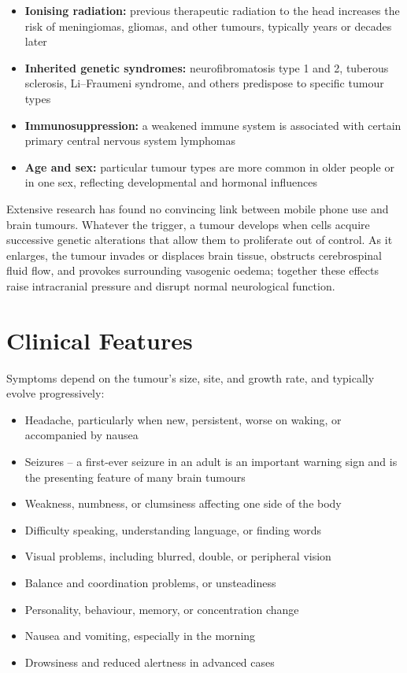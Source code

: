 \begin{itemize}
    \item \textbf{Ionising radiation:} previous therapeutic radiation to the head increases the risk of meningiomas, gliomas, and other tumours, typically years or decades later
    \item \textbf{Inherited genetic syndromes:} neurofibromatosis type 1 and 2, tuberous sclerosis, Li--Fraumeni syndrome, and others predispose to specific tumour types
    \item \textbf{Immunosuppression:} a weakened immune system is associated with certain primary central nervous system lymphomas
    \item \textbf{Age and sex:} particular tumour types are more common in older people or in one sex, reflecting developmental and hormonal influences
\end{itemize}

Extensive research has found no convincing link between mobile phone use and brain tumours. Whatever the trigger, a tumour develops when cells acquire successive genetic alterations that allow them to proliferate out of control. As it enlarges, the tumour invades or displaces brain tissue, obstructs cerebrospinal fluid flow, and provokes surrounding vasogenic oedema; together these effects raise intracranial pressure and disrupt normal neurological function.

\section*{Clinical Features}
Symptoms depend on the tumour's size, site, and growth rate, and typically evolve progressively:

\begin{itemize}
    \item Headache, particularly when new, persistent, worse on waking, or accompanied by nausea
    \item Seizures -- a first-ever seizure in an adult is an important warning sign and is the presenting feature of many brain tumours
    \item Weakness, numbness, or clumsiness affecting one side of the body
    \item Difficulty speaking, understanding language, or finding words
    \item Visual problems, including blurred, double, or peripheral vision
    \item Balance and coordination problems, or unsteadiness
    \item Personality, behaviour, memory, or concentration change
    \item Nausea and vomiting, especially in the morning
    \item Drowsiness and reduced alertness in advanced cases
\end{itemize}

